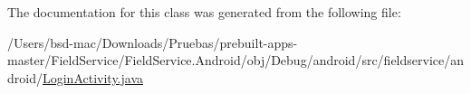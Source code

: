 The documentation for this class was generated from the following file\+:\begin{DoxyCompactItemize}
\item 
/\+Users/bsd-\/mac/\+Downloads/\+Pruebas/prebuilt-\/apps-\/master/\+Field\+Service/\+Field\+Service.\+Android/obj/\+Debug/android/src/fieldservice/android/\hyperlink{_login_activity_8java}{Login\+Activity.\+java}\end{DoxyCompactItemize}
